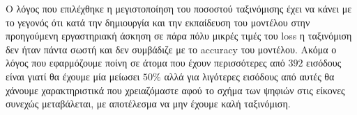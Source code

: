 \documentclass[12pt,a4paper]{article}
\newcommand{\tl}{\textlatin}
\begin{document}
\begin{enumerate}
\begin{itemize}
                    \end{itemize}
                    Ο λόγος που επιλέχθηκε η μεγιστοποίηση του ποσοστού
                    ταξινόμισης έχει να κάνει με το γεγονός ότι κατά την δημιουργία και την
                    εκπαίδευση του μοντέλου στην προηγούμενη εργαστηριακή άσκηση
                    σε πάρα πόλυ μικρές τιμές του \tl{loss} η ταξινόμιση δεν
                    ήταν πάντα σωστή και δεν συμβάδιζε με το \tl{accuracy} του
                    μοντέλου. Ακόμα ο λόγος που εφαρμόζουμε ποίνη σε άτομα που
                    έχουν περισσότερες από $392$ εισόδους είναι γιατί θα έχουμε
                    μία μείωσει $50\%$ αλλά για λιγότερες εισόδους από αυτές θα
                    χάνουμε χαρακτηριστικά που χρειαζόμαστε αφού το σχήμα των
                    ψηφιών στις είκονες συνεχώς μεταβάλεται, με αποτέλεσμα να
                    μην έχουμε καλή ταξινόμιση.


\end{enumerate}
\end{document}
